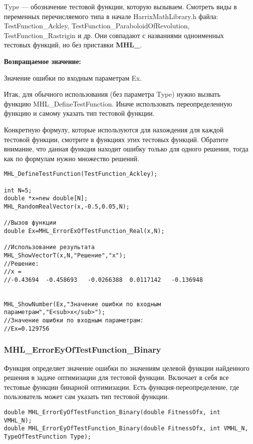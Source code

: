 \documentclass[a4paper,12pt]{article}
\begin{document}
Type --- обозначение тестовой функции, которую вызываем.
Смотреть виды в переменных перечисляемого типа в начале HarrixMathLibrary.h файла: TestFunction\_Ackley, TestFunction\_ParaboloidOfRevolution, TestFunction\_Rastrigin и др. Они совпадают с названиями одноименных тестовых функций, но без приставки \textbf{MHL\_}.

\textbf{Возвращаемое значение:}
 
Значение ошибки по входным параметрам Ex.

Итак, для обычного использования (без параметра Type) нужно вызвать функцию MHL\_DefineTestFunction. Иначе использовать переопределенную функцию и самому указать тип тестовой функции.

Конкретную формулу, которые используются для нахождения для каждой тестовой функции, смотрите в функциях этих тестовых функций. Обратите внимание, что данная функция находит ошибку только для одного решения, тогда как по формулам нужно множество решений.


\begin{lstlisting}[label=code_use_MHL_ErrorExOfTestFunction_Real,caption=Пример использования]
MHL_DefineTestFunction(TestFunction_Ackley);

int N=5;
double *x=new double[N];
MHL_RandomRealVector(x,-0.5,0.05,N);

//Вызов функции
double Ex=MHL_ErrorExOfTestFunction_Real(x,N);

//Использование результата
MHL_ShowVectorT(x,N,"Решение","x");
//Решение:
//x =
//-0.43694	-0.458693	-0.0266388	0.0117142	-0.136948


MHL_ShowNumber(Ex,"Значение ошибки по входным параметрам","E<sub>x</sub>");
//Значение ошибки по входным параметрам:
//Ex=0.129756
\end{lstlisting}

\subsubsection{MHL\_ErrorEyOfTestFunction\_Binary}\label{MHL_ErrorEyOfTestFunction_Binary}

Функция определяет значение ошибки по значениям целевой функции найденного решения в задаче оптимизации для тестовой функции. Включает в себя все тестовые функции бинарной оптимизации. Есть функция-переопределение, где пользователь может сам указать тип тестовой функции.


\begin{lstlisting}[label=code_syntax_MHL_ErrorEyOfTestFunction_Binary,caption=Синтаксис]
double MHL_ErrorEyOfTestFunction_Binary(double FitnessOfx, int VMHL_N);
double MHL_ErrorEyOfTestFunction_Binary(double FitnessOfx, int VMHL_N, TypeOfTestFunction Type);
\end{lstlisting}
\end{document}
